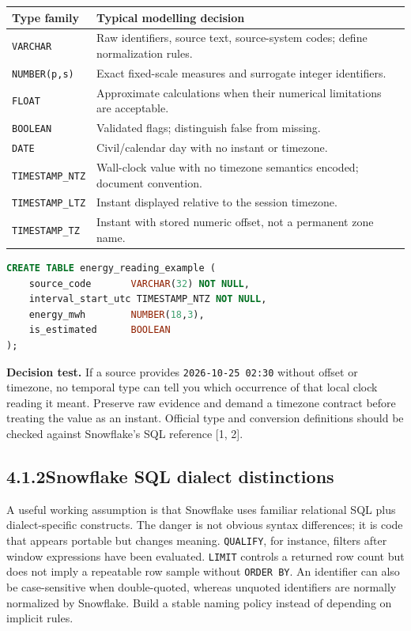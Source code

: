 \documentclass[11pt,twoside]{article}
\newcommand{\topic}[2]{\subsection*{#1\quad #2}}
\begin{document}
\begin{center}
\small\begin{tabularx}{\linewidth}{@{}p{31mm}X@{}}\toprule
Type family & Typical modelling decision\\\midrule
\texttt{VARCHAR} & Raw identifiers, source text, source-system codes; define normalization rules.\\
\texttt{NUMBER(p,s)} & Exact fixed-scale measures and surrogate integer identifiers.\\
\texttt{FLOAT} & Approximate calculations when their numerical limitations are acceptable.\\
\texttt{BOOLEAN} & Validated flags; distinguish false from missing.\\
\texttt{DATE} & Civil/calendar day with no instant or timezone.\\
\texttt{TIMESTAMP\_NTZ} & Wall-clock value with no timezone semantics encoded; document convention.\\
\texttt{TIMESTAMP\_LTZ} & Instant displayed relative to the session timezone.\\
\texttt{TIMESTAMP\_TZ} & Instant with stored numeric offset, not a permanent zone name.\\\bottomrule
\end{tabularx}
\end{center}

\begin{lstlisting}[language=SQL,caption={Type choices; intended for a dedicated book schema.}]
CREATE TABLE energy_reading_example (
    source_code       VARCHAR(32) NOT NULL,
    interval_start_utc TIMESTAMP_NTZ NOT NULL,
    energy_mwh        NUMBER(18,3),
    is_estimated      BOOLEAN
);
\end{lstlisting}
\textbf{Decision test.} If a source provides \texttt{2026-10-25 02:30} without offset or timezone, no temporal type can tell you which occurrence of that local clock reading it meant. Preserve raw evidence and demand a timezone contract before treating the value as an instant. Official type and conversion definitions should be checked against Snowflake's SQL reference [1, 2].

\newpage
\topic{4.1.2}{Snowflake SQL dialect distinctions}
A useful working assumption is that Snowflake uses familiar relational SQL plus dialect-specific constructs. The danger is not obvious syntax differences; it is code that appears portable but changes meaning. \texttt{QUALIFY}, for instance, filters after window expressions have been evaluated. \texttt{LIMIT} controls a returned row count but does not imply a repeatable row sample without \texttt{ORDER BY}. An identifier can also be case-sensitive when double-quoted, whereas unquoted identifiers are normally normalized by Snowflake. Build a stable naming policy instead of depending on implicit rules.
\end{document}
